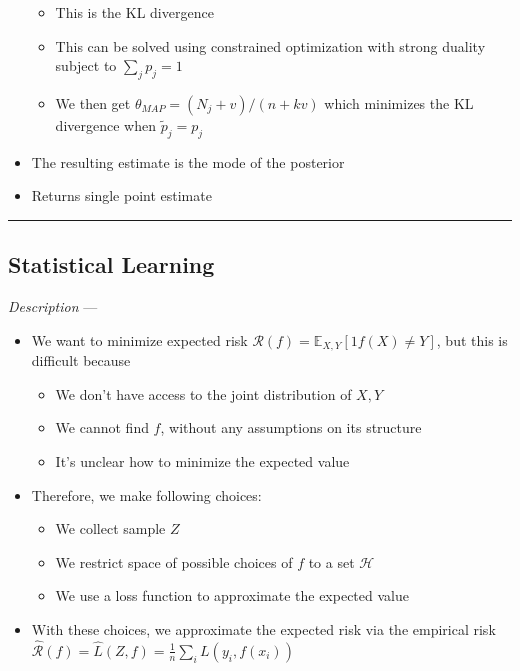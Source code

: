 \begin{itemize}
\begin{itemize}
        \item This is the KL divergence 
        \item This can be solved using constrained optimization with strong duality subject to $\sum_j p_j = 1$
        \item We then get $\theta_{MAP} = (N_j + v)/(n + kv)$ which minimizes the KL divergence when $\tilde{p}_j = p_j$
    \end{itemize}
    \item The resulting estimate is the mode of the posterior 
    \item Returns single point estimate
\end{itemize}

{\color{black}\hrule height 0.001mm}

\subsection*{Statistical Learning}
\emph{Description} --- 
\begin{itemize}
    \item We want to minimize expected risk $\mathcal{R}(f) = \mathbb{E}_{X,Y}[1{f(X) \neq Y}]$, but this is difficult because
    \begin{itemize}
        \item We don't have access to the joint distribution of $X,Y$
        \item We cannot find $f$, without any assumptions on its structure
        \item It's unclear how to minimize the expected value
    \end{itemize}
    \item Therefore, we make following choices:
    \begin{itemize}
        \item We collect sample $Z$
        \item We restrict space of possible choices of $f$ to a set $\mathcal{H}$
        \item We use a loss function to approximate the expected value
    \end{itemize}
    \item With these choices, we approximate the expected risk via the empirical risk $\hat{\mathcal{R}}(f) = \hat{L}(Z,f) = \frac{1}{n} \sum_i L(y_i, f(x_i))$
\end{itemize}